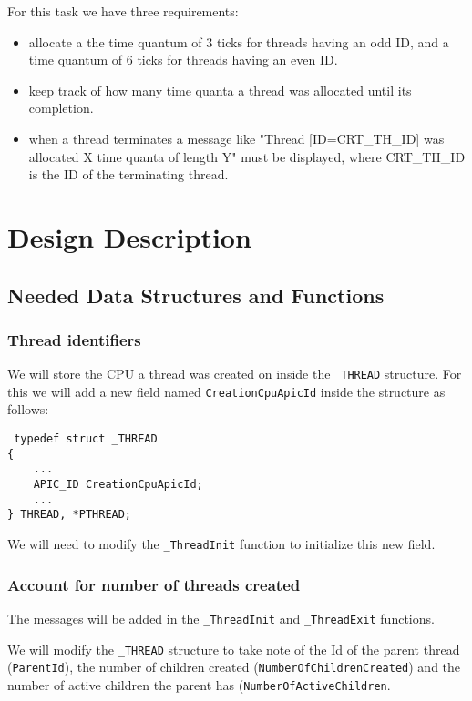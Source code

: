 For this task we have three requirements:
\begin{itemize}
    \item allocate a the time quantum of 3 ticks for threads having an odd ID, and a time quantum of 6 ticks for threads having an even ID. 
    \item keep track of how many time quanta a thread was allocated until its completion. 
    \item when a thread terminates a message like "Thread [ID=CRT\_TH\_ID] was allocated X time quanta of length Y" must be displayed, where CRT\_TH\_ID is the ID of the terminating thread.
\end{itemize}



\section{Design Description}

\subsection{Needed Data Structures and Functions}
\subsubsection{Thread identifiers}
We will store the CPU a thread was created on inside the \lstinline|_THREAD| structure. For this we will add a new field named \lstinline|CreationCpuApicId| inside the structure as follows:

\begin{lstlisting}
 typedef struct _THREAD
{
    ...
    APIC_ID CreationCpuApicId;
    ...
} THREAD, *PTHREAD;
\end{lstlisting}

We will need to modify the \lstinline|_ThreadInit| function to initialize this new field. 

\subsubsection{Account for number of threads created}

The messages will be added in the \lstinline|_ThreadInit| and \lstinline|_ThreadExit| functions. 

We will modify the \lstinline|_THREAD| structure to take note of the Id of the parent thread (\lstinline|ParentId|), the number of children created (\lstinline|NumberOfChildrenCreated|) and the number of active children the parent has (\lstinline|NumberOfActiveChildren|. 

